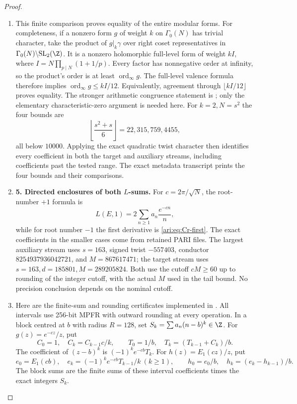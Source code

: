 \begin{proof}
\begin{enumerate}[label=\arabic*.,leftmargin=*]
\item This finite comparison proves equality of the entire modular forms.
For completeness, if a nonzero form $g$ of weight $k$ on
$\Gamma_0(N)$ has trivial character, take the product of
$g|_k\gamma$ over right coset representatives in
$\Gamma_0(N)\backslash\mathrm{SL}_2(\Z)$. It is a nonzero
holomorphic full-level form of weight $kI$, where
$I=N\prod_{p\mid N}(1+1/p)$. Every factor has nonnegative
order at infinity, so the product's order is at least
$\operatorname{ord}_\infty g$. The full-level valence formula
therefore implies $\operatorname{ord}_\infty g\leq kI/12$.
Equivalently, agreement through $\lfloor kI/12\rfloor$ proves
equality. The stronger arithmetic congruence statement is
\citet[Theorem 9.18]{CgzStein2007}; only the elementary
characteristic-zero argument is needed here. For $k=2,N=s^2$
the four bounds are
\[
 \left\lfloor\frac{s^2+s}{6}\right\rfloor
     =22,315,759,4455,
\]
all below $10000$. Applying the exact quadratic twist character
then identifies every coefficient in both the target and auxiliary
streams, including coefficients past the tested range. The exact
metadata transcript prints the four bounds and their comparisons.

\item \textbf{5. Directed enclosures of both $L$-sums.}
For $c=2\pi/\sqrt N$, the root-number $+1$ formula is
\[
 L(E,1)=2\sum_{n\geq1}a_n\frac{e^{-cn}}n,
\]
while for root number $-1$ the first derivative is
\eqref{ari:eq:Cr-first}. The exact coefficients in the smaller cases
come from retained PARI files. The largest auxiliary stream uses
$s=163$, signed twist $-557403$, conductor
$8254937936042721$, and $M=867617471$; the target stream uses
$s=163,d=185801,M=289205824$. Both use the cutoff $cM\geq60$
up to rounding of the integer cutoff, with the actual $M$ used in
the tail bound. No precision conclusion depends on the nominal
cutoff.

\item Here are the finite-sum and rounding certificates implemented in
. All intervals use 256-bit
MPFR with outward rounding at every operation. In a block centred
at $b$ with radius $R=128$, set
$S_k=\sum a_n(n-b)^k\in\Z$. For $g(z)=e^{-cz}/z$, put
\[
 C_0=1,\quad C_k=C_{k-1}c/k,\qquad
 T_0=1/b,\quad T_k=(T_{k-1}+C_k)/b.
\]
The coefficient of $(z-b)^k$ is $(-1)^ke^{-cb}T_k$.
For $h(z)=E_1(cz)/z$, put
\[
 e_0=E_1(cb),\quad e_k=(-1)^ke^{-cb}T_{k-1}/k\ (k\geq1),
 \qquad h_0=e_0/b,\quad h_k=(e_k-h_{k-1})/b.
\]
The block sums are the finite sums of these interval coefficients
times the exact integers $S_k$.


\end{enumerate}
\end{proof}
